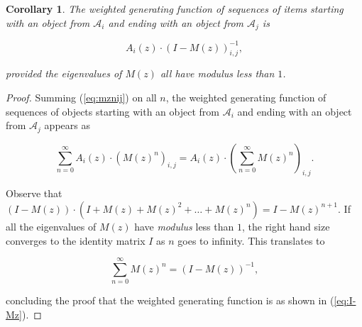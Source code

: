 \documentclass{article}
\newtheorem{corollary}{Corollary}
\begin{document}

\begin{corollary}
The weighted generating function of sequences of items starting with an
object from $\mathcal{A}_i$ and ending with an object from $\mathcal{A}_j$
is

\begin{equation}
\label{eq:I-Mz}
A_i(z) \cdot \left( I - M(z) \right)^{-1}_{i,j},
\end{equation}

\noindent
provided the eigenvalues of $M(z)$ all have \textit{modulus} less than
$1$.
\end{corollary}

\begin{proof}
Summing (\ref{eq:mznij}) on all $n$, the weighted generating function of
sequences of objects starting with an object from $\mathcal{A}_i$ and
ending with an object from $\mathcal{A}_j$ appears as

\begin{equation*}
\sum_{n=0}^\infty A_i(z) \cdot \left(M(z)^n \right)_{i,j} =
 A_i(z) \cdot \left( \sum_{n=0}^\infty M(z)^n\right)_{i,j}.
\end{equation*}

Observe that $(I-M(z)) \cdot (I+M(z)+M(z)^2+ \ldots + M(z)^n) =
I-M(z)^{n+1}$. If all the eigenvalues of $M(z)$ have \textit{modulus} less
than $1$, the right hand size converges to the identity matrix $I$ as $n$
goes to infinity. This translates to

\begin{equation*}
\sum_{n=0}^\infty M(z)^n = (I-M(z))^{-1},
\end{equation*}

\noindent
concluding the proof that the weighted generating function is as shown in
(\ref{eq:I-Mz}).
\end{proof}
\end{document}
